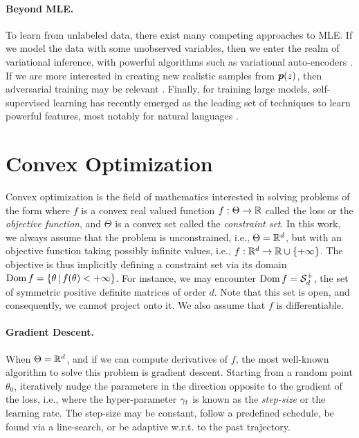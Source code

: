 \paragraph{Beyond MLE.}
To learn from unlabeled data, there exist many competing approaches to MLE.
If we model the data with some unobserved variables, then we enter the realm of variational inference, with powerful algorithms such as variational auto-encoders \citep{kingma2013auto}.
If we are more interested in creating new realistic samples from $\bm{p}(z)$, then adversarial training may be relevant \citep{goodfellow2014generative}.
Finally, for training large models, self-supervised learning has recently emerged as the leading set of techniques to learn powerful features, most notably for natural languages \citep{peters2018deep,devlin2018bert}.


\section{Convex Optimization}
Convex optimization is the field of mathematics interested in solving problems of the form
where $f$ is a convex real valued function $f:\Theta \rightarrow \mathbb{R}$ called the loss or the \emph{objective function}, and $\Theta$ is a convex set called the \emph{constraint set}.
In this work, we always assume that the problem is unconstrained, i.e., $\Theta = \mathbb{R}^d$,
but with an objective function taking possibly infinite values, i.e., $f: \mathbb{R}^d \rightarrow \mathbb{R} \cup \{+\infty\}$.
The objective is thus implicitly defining a constraint set via its domain $\operatorname{\mathrm{Dom}} f = \{ \theta \,\vert\, f(\theta) < +\infty \}$.
For instance, we may encounter $\operatorname{\mathrm{Dom}} f = {\mathcal S}_d^+$, the set of symmetric positive definite matrices of order $d$. Note that this set is open, and consequently, we cannot project onto it.
We also assume that $f$ is differentiable.

\paragraph{Gradient Descent.}
When $\Theta = \mathbb{R}^d$, and if we can compute derivatives of $f$, the most well-known algorithm to solve this problem is gradient descent.
Starting from a random point $\theta_0$, iteratively nudge the parameters in the direction opposite to the gradient of the loss, i.e.,
where the hyper-parameter $\gamma_t$ is known as the \emph{step-size} or the learning rate.
The step-size may be constant, follow a predefined schedule, be found via a line-search, or be adaptive w.r.t. to the past trajectory.

